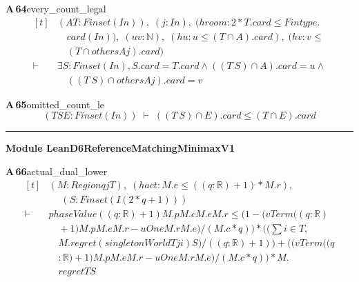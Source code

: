 \documentclass[conference]{IEEEtran}
\theoremstyle{definition}
\newcommand{\lean}[1]{\textsf{\footnotesize #1}}
\begin{document}
\noindent\textbf{A\,64}\quad\lean{every\_count\_legal}
{\footnotesize\[ \begin{aligned}[t]
&(\mathit{A} \mathit{T} : \mathit{Finset} (\mathit{I} \mathit{n})),\; (\mathit{j} : \mathit{I} \mathit{n}),\; (\mathit{hroom} : 2*\mathit{T}.\mathit{card} \leq \mathit{Fintype}.\\
&\quad \mathit{card} (\mathit{I} \mathit{n})),\; (\mathit{u} \mathit{v} : \mathbb{N} ),\; (\mathit{hu} : \mathit{u} \leq (\mathit{T} \cap \mathit{A}).\mathit{card}),\; (\mathit{hv} : \mathit{v} \leq\\
&\quad (\mathit{T} \cap \mathit{others} \mathit{A} \mathit{j}).\mathit{card})\\
\vdash\;&\exists \mathit{S} : \mathit{Finset} (\mathit{I} \mathit{n}), \mathit{S}.\mathit{card}=\mathit{T}.\mathit{card} \wedge ((\mathit{T} \ \mathit{S}) \cap \mathit{A}).\mathit{card}=\mathit{u} \wedge\\
&\quad ((\mathit{T} \ \mathit{S}) \cap \mathit{others} \mathit{A} \mathit{j}).\mathit{card}=\mathit{v}
\end{aligned} \]}

\noindent\textbf{A\,65}\quad\lean{omitted\_count\_le}
{\footnotesize\[ (\mathit{T} \mathit{S} \mathit{E} : \mathit{Finset} (\mathit{I} \mathit{n})) \;\vdash\; ((\mathit{T} \ \mathit{S}) \cap \mathit{E}).\mathit{card} \leq (\mathit{T} \cap \mathit{E}).\mathit{card} \]}

\vspace{4pt}\noindent\rule{\columnwidth}{0.4pt}\par\vspace{2pt}
\noindent\textbf{Module \lean{LeanD6ReferenceMatchingMinimaxV1}}\par\vspace{3pt}

\noindent\textbf{A\,66}\quad\lean{actual\_dual\_lower}
{\footnotesize\[ \begin{aligned}[t]
&(\mathit{M} : \mathit{Region} \mathit{q} \mathit{j} \mathit{T}),\; (\mathit{hact} : \mathit{M}.\mathit{e} \leq ((\mathit{q}:\mathbb{R} )+1)*\mathit{M}.\mathit{r}),\\
&\quad \; (\mathit{S} : \mathit{Finset} (\mathit{I} (2*\mathit{q}+1)))\\
\vdash\;&\mathit{phaseValue} ((\mathit{q}:\mathbb{R} )+1) \mathit{M}.\mathit{p} \mathit{M}.\mathit{c} \mathit{M}.\mathit{e} \mathit{M}.\mathit{r} \leq (1-(\mathit{vTerm} ((\mathit{q}:\mathbb{R} )\\
&\quad +1) \mathit{M}.\mathit{p} \mathit{M}.\mathit{e} \mathit{M}.\mathit{r}-\mathit{uOne} \mathit{M}.\mathit{r} \mathit{M}.\mathit{e})/(\mathit{M}.\mathit{c}*\mathit{q}))* ((\textstyle\sum \mathit{i} \in \mathit{T},\\
&\quad \mathit{M}.\mathit{regret} (\mathit{singletonWorld} \mathit{T} \mathit{j} \mathit{i}) \mathit{S})/((\mathit{q}:\mathbb{R} )+1))+ ((\mathit{vTerm} ((\mathit{q}\\
&\quad :\mathbb{R} )+1) \mathit{M}.\mathit{p} \mathit{M}.\mathit{e} \mathit{M}.\mathit{r}-\mathit{uOne} \mathit{M}.\mathit{r} \mathit{M}.\mathit{e})/(\mathit{M}.\mathit{c}*\mathit{q}))*\mathit{M}.\\
&\quad \mathit{regret} \mathit{T} \mathit{S}
\end{aligned} \]}
\end{document}
